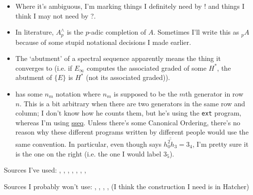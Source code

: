 \documentclass{MetricNotes2023}
\DeclareMathOperator{\colim}{colim}
\begin{document}
\begin{itemize}
\item Where it's ambiguous, I'm marking things I definitely need by ! and things I think I may not need by ?.


\item In literature, \(A^\wedge_p\) is the \(p\)-adic completion of \(A\). Sometimes I'll write this as \(\text{}_pA\) because of some stupid notational decisions I made earlier.

\item The `abutment' of a spectral sequence apparently means the thing it converges to (i.e. if \(E_\infty\) computes the associated graded of some \(H^*\), the abutment of \(\{E\}\) is \(H^*\) (not its associated graded)). 

\item \autocite{rognes2} has some \(n_m\) notation where \(n_m\) is supposed to be the \(m\)th generator in row \(n\). This is a bit arbitrary when there are two generators in the same row and column; I don't know how he counts them, but he's using the \verb|ext| program, whereas I'm using \href{https://spectralsequences.github.io/sseq/}{sseq}. Unless there's some Canonical Ordering, there's no reason why these different programs written by different people would use the same convention. In particular, even though \autocite{rognes2} says \(\overline{\overline{h_0^2h_3}}=3_4\), I'm pretty sure it is the one on the right (i.e. the one I would label \(3_5\)). 
\end{itemize}

Sources I've used: \autocite{cobordism}, 
\autocite{ass}, \autocite{spectra}, \autocite{hatcher5}, \autocite{hatcher}, \autocite{rognes2}, \autocite{concise}, \autocite{spectral_sequences}

Sources I probably won't use: \autocite{suspension}, \autocite{stable_homotopy}, \autocite{foundations}, \autocite{primer}, \autocite{mazelgee} (I think the construction I need is in Hatcher)

\printbibliography
\end{document}
